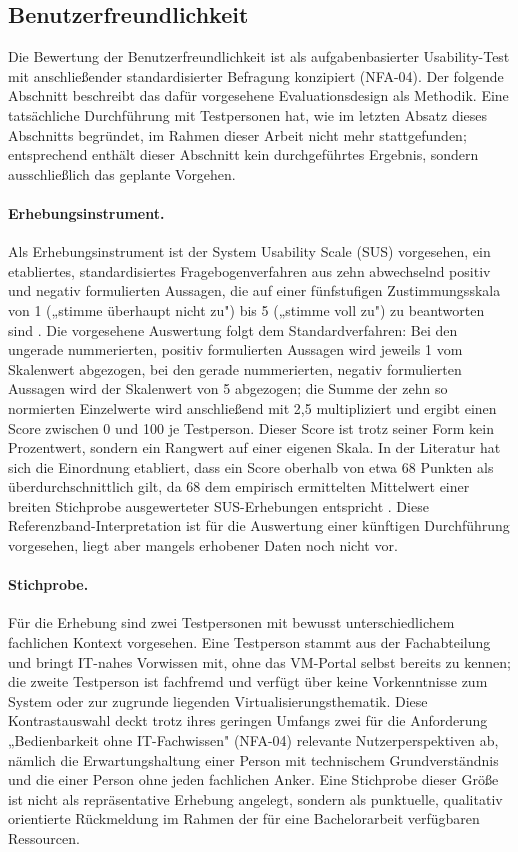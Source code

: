 \documentclass[12pt,a4paper]{article}
\begin{document}
\subsection{Benutzerfreundlichkeit}
\label{sec:eval-usability}

Die Bewertung der Benutzerfreundlichkeit ist als aufgabenbasierter Usability-Test mit anschließender standardisierter Befragung konzipiert (NFA-04). Der folgende Abschnitt beschreibt das dafür vorgesehene Evaluationsdesign als Methodik. Eine tatsächliche Durchführung mit Testpersonen hat, wie im letzten Absatz dieses Abschnitts begründet, im Rahmen dieser Arbeit nicht mehr stattgefunden; entsprechend enthält dieser Abschnitt kein durchgeführtes Ergebnis, sondern ausschließlich das geplante Vorgehen.

\paragraph{Erhebungsinstrument.} Als Erhebungsinstrument ist der System Usability Scale (SUS) vorgesehen, ein etabliertes, standardisiertes Fragebogenverfahren aus zehn abwechselnd positiv und negativ formulierten Aussagen, die auf einer fünfstufigen Zustimmungsskala von 1 („stimme überhaupt nicht zu") bis 5 („stimme voll zu") zu beantworten sind \parencite{brooke1996sus}. Die vorgesehene Auswertung folgt dem Standardverfahren: Bei den ungerade nummerierten, positiv formulierten Aussagen wird jeweils 1 vom Skalenwert abgezogen, bei den gerade nummerierten, negativ formulierten Aussagen wird der Skalenwert von 5 abgezogen; die Summe der zehn so normierten Einzelwerte wird anschließend mit 2,5 multipliziert und ergibt einen Score zwischen 0 und 100 je Testperson. Dieser Score ist trotz seiner Form kein Prozentwert, sondern ein Rangwert auf einer eigenen Skala. In der Literatur hat sich die Einordnung etabliert, dass ein Score oberhalb von etwa 68 Punkten als überdurchschnittlich gilt, da 68 dem empirisch ermittelten Mittelwert einer breiten Stichprobe ausgewerteter SUS-Erhebungen entspricht \parencite{bangor2008sus}. Diese Referenzband-Interpretation ist für die Auswertung einer künftigen Durchführung vorgesehen, liegt aber mangels erhobener Daten noch nicht vor.

\paragraph{Stichprobe.} Für die Erhebung sind zwei Testpersonen mit bewusst unterschiedlichem fachlichen Kontext vorgesehen. Eine Testperson stammt aus der Fachabteilung und bringt IT-nahes Vorwissen mit, ohne das VM-Portal selbst bereits zu kennen; die zweite Testperson ist fachfremd und verfügt über keine Vorkenntnisse zum System oder zur zugrunde liegenden Virtualisierungsthematik. Diese Kontrastauswahl deckt trotz ihres geringen Umfangs zwei für die Anforderung „Bedienbarkeit ohne IT-Fachwissen" (NFA-04) relevante Nutzerperspektiven ab, nämlich die Erwartungshaltung einer Person mit technischem Grundverständnis und die einer Person ohne jeden fachlichen Anker. Eine Stichprobe dieser Größe ist nicht als repräsentative Erhebung angelegt, sondern als punktuelle, qualitativ orientierte Rückmeldung im Rahmen der für eine Bachelorarbeit verfügbaren Ressourcen.
\end{document}
